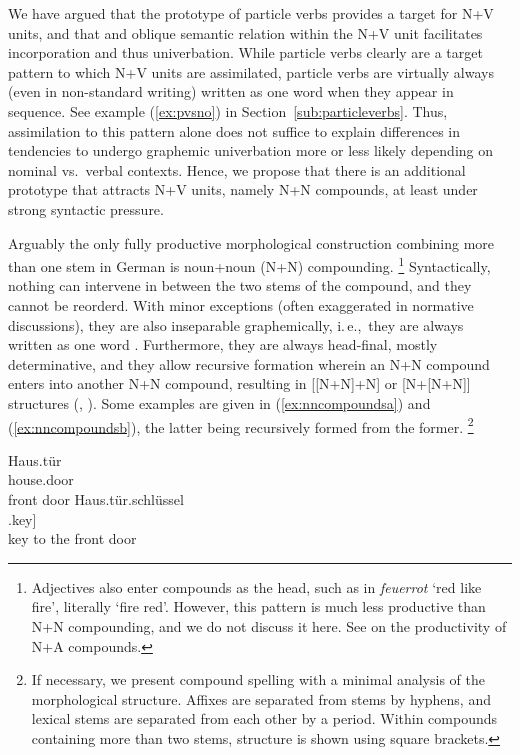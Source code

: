 \documentclass[biblatex, charis, linguex]{glossa}\usepackage{knitr}
\newcommand{\ie}{i.\,e.,\ }
\begin{document}
We have argued that the prototype of particle verbs provides a target for N+V units, and that and oblique semantic relation within the N+V unit facilitates incorporation and thus univerbation.
While particle verbs clearly are a target pattern to which N+V units are assimilated, particle verbs are virtually always (even in non-standard writing) written as one word when they appear in sequence.
See example (\ref{ex:pvsno}) in Section~\ref{sub:particleverbs}.
Thus, assimilation to this pattern alone does not suffice to explain differences in tendencies to undergo graphemic univerbation more or less likely depending on nominal vs.\ verbal contexts.
Hence, we propose that there is an additional prototype that attracts N+V units, namely N+N compounds, at least under strong syntactic pressure.

Arguably the only fully productive morphological construction combining more than one stem in German is noun+noun (N+N) compounding.%
\footnote{Adjectives also enter compounds as the head, such as in \textit{feuerrot} `red like fire', literally `fire red'.
However, this pattern is much less productive than N+N compounding, and we do not discuss it here.
See \citet[136]{Simunic2018} on the productivity of N+A compounds.}
Syntactically, nothing can intervene in between the two stems of the compound, and they cannot be reorderd.
With minor exceptions (often exaggerated in normative discussions), they are also inseparable graphemically, \ie they are always written as one word \parencite[57--60]{Scherer2012}.
Furthermore, they are always head-final, mostly determinative, and they allow recursive formation wherein an N+N compound enters into another N+N compound, resulting in [[N+N]+N] or [N+[N+N]] structures (\citealt[13]{FleischerBartz2012}, \citealt[504]{Wurzel1994}).
Some examples are given in (\ref{ex:nncompoundsa}) and (\ref{ex:nncompoundsb}), the latter being recursively formed from the former.%
\footnote{If necessary, we present compound spelling with a minimal analysis of the morphological structure.
Affixes are separated from stems by hyphens, and lexical stems are separated from each other by a period.
Within compounds containing more than two stems, structure is shown using square brackets.}

\begin{exe}
  \ex\gll Haus.tür\\
  house.door\\
  \trans front door\label{ex:nncompoundsa}
  \ex\gll Haus.tür.schlüssel\\
  [[house.door].key]\\
  \trans key to the front door\label{ex:nncompoundsb}
\end{exe}
\end{document}
